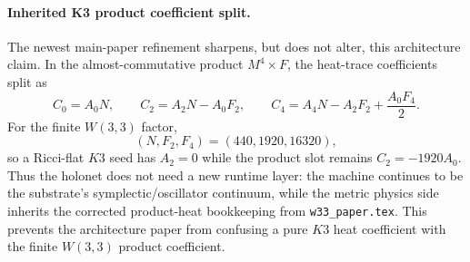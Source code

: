 
\paragraph{Inherited K3 product coefficient split.}
The newest main-paper refinement sharpens, but does not alter, this architecture
claim.  In the almost-commutative product $M^4\times F$, the heat-trace
coefficients split as
\[
  C_0=A_0N,\qquad C_2=A_2N-A_0F_2,\qquad
  C_4=A_4N-A_2F_2+\frac{A_0F_4}{2}.
\]
For the finite $W(3,3)$ factor,
\[
  (N,F_2,F_4)=(440,1920,16320),
\]
so a Ricci-flat $K3$ seed has $A_2=0$ while the product slot remains
$C_2=-1920A_0$.  Thus the holonet does not need a new runtime layer: the machine
continues to be the substrate's symplectic/oscillator continuum, while the metric
physics side inherits the corrected product-heat bookkeeping from
\texttt{w33\_paper.tex}.  This prevents the architecture paper from confusing a
pure $K3$ heat coefficient with the finite $W(3,3)$ product coefficient.
